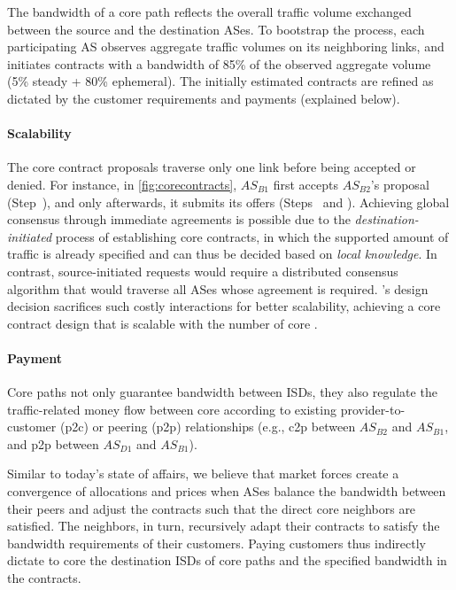 The bandwidth of a core path reflects the overall traffic volume exchanged
between the source and the destination ASes. To bootstrap the process, each
participating AS observes aggregate traffic volumes on its neighboring links,
and initiates contracts with a bandwidth of 85\% of the observed aggregate
volume (5\% steady + 80\% ephemeral). The initially estimated contracts are
refined as dictated by the customer requirements and payments (explained below).



\paragraph{Scalability} The core contract proposals traverse only one link
before being accepted or denied. For instance, in \autoref{fig:corecontracts},
$AS_{B1}$ first accepts $AS_{B2}$'s proposal (Step~), and only
afterwards, it submits its offers (Steps~ and ). Achieving
global consensus through immediate agreements is possible due to the
\textit{destination-initiated} process of establishing core contracts, in which
the supported amount of traffic is already specified and can thus be decided
based on \textit{local knowledge}. In contrast, source-initiated requests would
require a distributed consensus algorithm that would traverse all ASes whose
agreement is required. \name's design decision sacrifices such costly
interactions for better scalability, achieving a core contract design that is
scalable with the number of core \ADs.


\paragraph{Payment} Core paths not only guarantee bandwidth between
ISDs, they also regulate the traffic-related money flow between core
\ADs according to existing provider-to-customer (p2c) or peering (p2p)
relationships (e.g., c2p between $AS_{B2}$ and $AS_{B1}$, and p2p
between $AS_{D1}$ and $AS_{B1}$).

Similar to today's state of affairs, we believe that market forces create a
convergence of allocations and prices when ASes balance the bandwidth between
their peers and adjust the contracts such that the direct core \AD neighbors
are satisfied. The neighbors, in turn, recursively adapt their contracts to
satisfy the bandwidth requirements of their customers. Paying customers thus
indirectly dictate to core \ADs the destination ISDs of core paths and the
specified bandwidth in the contracts.


